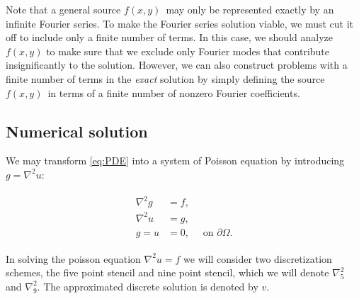 Note that a general source $f(x,y)$ may only be represented exactly by an infinite Fourier series.
To make the Fourier series solution viable, we must cut it off to include only a finite number of terms.
In this case, we should analyze $f(x,y)$ to make sure that we exclude only Fourier modes that contribute insignificantly to the solution.
However, we can also construct problems with a finite number of terms in the \emph{exact} solution by simply defining the source $f(x,y)$ in terms of a finite number of nonzero Fourier coefficients.


\subsection{Numerical solution}
\label{sec:pde:numerical_solution}

We may transform \eqref{eq:PDE} into a system of Poisson equation by introducing $g = \nabla^2 u$:

\begin{align}\label{eq:PDE-poisson}
  \begin{split}
    \nabla^2g &= f,\\
    \nabla^2u &= g,\\
    g = u &= 0,\quad \text{ on } \partial \Omega.
  \end{split}
\end{align}


In solving the poisson equation $\nabla^2 u = f$ we will consider two discretization schemes, the five point stencil and nine point stencil, which we will denote $\nabla_5^2$ and $\nabla_9^2$.
The approximated discrete solution is denoted by $v$.

\newcommand{\crossStencil}[5]{%
  \begin{tikzpicture}[scale=0.5,baseline={([yshift=-0.5ex]current bounding box.center)}, every node/.style={scale=0.7,inner sep=0pt, minimum size=6ex, fill=white}, nodes={draw, circle}]
    \draw node[below]{$#1$} (0,0) -- (0,2) node[above]{$#2$};
    \draw (-1, 1) node[left]{$#3$} -- (1, 1) node[right]{$#4$};
	\draw (0,1) node{$#5$};
  \end{tikzpicture}
}

\newcommand{\xStencil}[4]{%
  \begin{tikzpicture}[scale=0.5,baseline={([yshift=-0.5ex]current bounding box.center)}, every node/.style={scale=0.7,inner sep=0pt, minimum size=6ex, fill=white}, nodes={draw, circle}]
    \draw node[below left]{$#1$} (0,0) -- (2, 2) node[above right]{$#2$};
    \draw (0, 2) node[above left]{$#3$} -- (2, 0) node[below right]{$#4$};
  \end{tikzpicture}
}

